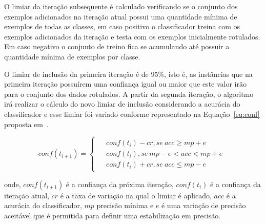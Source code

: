     O limiar da iteração subsequente é calculado verificando se o conjunto dos exemplos adicionados na iteração atual possui uma quantidade mínima de exemplos de todas as classes, em caso positivo o classificador treina com os exemplos adicionados da iteração e testa com os exemplos inicialmente rotulados. Em caso negativo o conjunto de treino fica se acumulando até possuir a quantidade mínima de exemplos por classe.
    
    O limiar de inclusão da primeira iteração é de 95\%, isto é, as instâncias que na primeira iteração possuírem uma confiança igual ou maior que este valor irão para o conjunto dos dados rotulados. A partir da segunda iteração, o algoritmo irá realizar o cálculo do novo limiar de inclusão considerando a acurácia do classificador e esse limiar foi variado conforme representado na Equação~\ref{eq:conf} proposta em~\cite{vale2018selftraining}.
    
    \begin{equation}
        \label{eq:conf}
            conf(t_{i+1}) = \left\{
            \begin{matrix}
            \begin{split}
                &conf(t_i) - cr,  se\ acc \geq mp + e \\ 
                &conf(t_i),       se\ mp - e < acc < mp + e \\ 
                &conf(t_i) + cr,  se\ acc \leq mp - e
            \end{split}
            \end{matrix}\right.
    \end{equation}
    
    \noindent
    onde, $conf(t_{i+1})$ é a confiança da próxima iteração, $conf(t_i)$ é a confiança da iteração atual, $cr$ é a taxa de variação na qual o limiar é aplicado, $acc$ é a acurácia do classificador, $mp$ precisão mínima e $e$ é uma variação de precisão aceitável que é permitida para definir uma estabilização em precisão.
    
